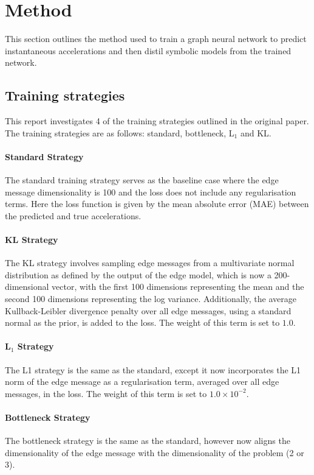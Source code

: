\documentclass[11pt]{article}
\begin{document}
\section{Method}
This section outlines the method used to train a graph neural network to predict instantaneous accelerations and then distil symbolic models from the trained network.
\subsection{Training strategies}
This report investigates 4 of the training strategies outlined in the original paper. The training strategies are as follows: standard, bottleneck, L$_1$ and KL. 

\paragraph*{Standard Strategy}
The standard training strategy serves as the baseline case where the edge message dimensionality is 100 and the loss does not include any regularisation terms. Here the loss function is given by the mean absolute error (MAE) between the predicted and true accelerations.

\paragraph*{KL Strategy}
The KL strategy involves sampling edge messages from a multivariate normal distribution as defined by the output of the edge model, which is now a 200-dimensional vector, with the first 100 dimensions representing the mean and the second 100 dimensions representing the log variance. Additionally, the average Kullback-Leibler divergence penalty over all edge messages, using a standard normal as the prior, is added to the loss. The weight of this term is set to \(1.0 \).

\paragraph*{L$_1$ Strategy}
The L1 strategy is the same as the standard, except it now incorporates the L1 norm of the edge message as a regularisation term, averaged over all edge messages, in the loss. The weight of this term is set to \(1.0 \times 10^{-2}\).

\paragraph*{Bottleneck Strategy}
The bottleneck strategy is the same as the standard, however now aligns the dimensionality of the edge message with the dimensionality of the problem (2 or 3).
\end{document}
